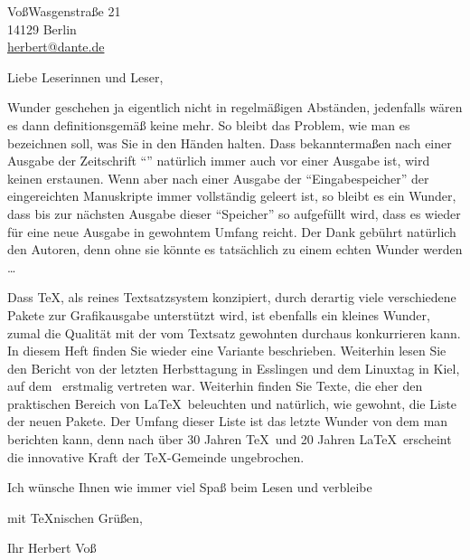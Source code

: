 \address{Herbert}{Vo\ss}{Wasgenstra\ss e 21\\
    14129 Berlin\\
    \protect\url{herbert@dante.de}}

Liebe Leserinnen und Leser,

Wunder geschehen ja eigentlich nicht in regelmäßigen Abständen, jedenfalls wären es dann definitionsgemäß
keine mehr. So bleibt das Problem, wie man es bezeichnen soll, was Sie in den Händen halten. Dass bekanntermaßen nach einer Ausgabe 
der Zeitschrift "`\DTK"'
natürlich immer auch vor einer Ausgabe ist, wird keinen erstaunen. Wenn aber nach einer Ausgabe der
"`Eingabespeicher"' der eingereichten Manuskripte immer vollständig geleert ist, so bleibt es ein Wunder,
dass bis zur nächsten Ausgabe dieser "`Speicher"' so aufgefüllt wird, dass es wieder für eine
neue Ausgabe in gewohntem Umfang reicht. Der Dank gebührt natürlich den Autoren, denn ohne sie könnte es tatsächlich zu einem echten
Wunder werden \ldots

Dass \TeX, als reines Textsatzsystem konzipiert, durch derartig viele verschiedene Pakete
zur Grafikausgabe unterstützt wird, ist ebenfalls ein kleines Wunder, zumal die
Qualität mit der vom Textsatz gewohnten durchaus konkurrieren kann. In diesem Heft
finden Sie wieder eine Variante beschrieben. Weiterhin lesen Sie den Bericht von
der letzten Herbsttagung in Esslingen und dem Linuxtag in Kiel, auf dem \dante\ erstmalig
vertreten war. Weiterhin finden Sie Texte, die eher den praktischen Bereich von \LaTeX\
beleuchten und natürlich, wie gewohnt, die Liste der neuen Pakete. Der Umfang dieser Liste ist das letzte Wunder
von dem man berichten kann, denn nach über 30 Jahren \TeX\ und 20 Jahren \LaTeX\ erscheint
die innovative Kraft der \TeX-Gemeinde ungebrochen.


\bigskip
Ich wünsche Ihnen  wie immer viel Spaß beim Lesen und verbleibe

mit \TeX nischen Grüßen, 

Ihr Herbert Voß

\endinput
